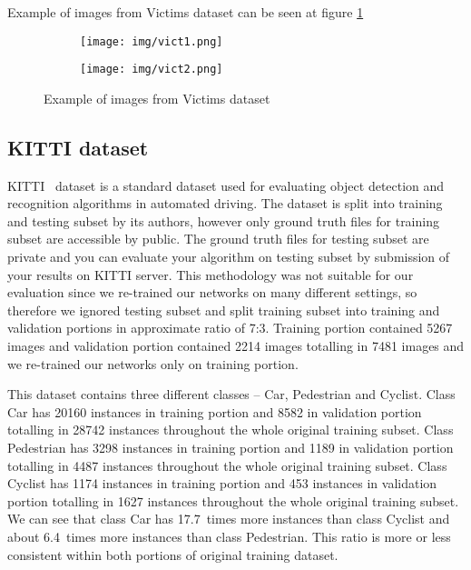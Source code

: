 Example of images from Victims dataset can be seen at figure \ref{victex}

\begin{figure}[!h]
\begin{subfigure}{.5\textwidth}
\centering
\texttt{[image: img/vict1.png]}
\end{subfigure}%
\begin{subfigure}{.5\textwidth}
\centering
\texttt{[image: img/vict2.png]}
\end{subfigure}
\caption{Example of images from Victims dataset}
\label{victex}
\end{figure}

\subsection{KITTI dataset}

KITTI~\cite{kitti} dataset is a standard dataset used for evaluating object detection and recognition algorithms in automated driving. The dataset is split into training and testing subset by its authors, however only ground truth files for training subset are accessible by public. The ground truth files for testing subset are private and you can evaluate your algorithm on testing subset by submission of your results on KITTI server. This methodology was not suitable for our evaluation since we re-trained our networks on many different settings, so therefore we ignored testing subset and split training subset into training and validation portions in approximate ratio of 7:3. Training portion contained 5267 images and validation portion contained 2214 images totalling in 7481 images and we re-trained our networks only on training portion.

This dataset contains three different classes -- Car, Pedestrian and Cyclist. Class Car has 20160 instances in training portion and 8582 in validation portion totalling in 28742 instances throughout the whole original training subset. Class Pedestrian has 3298 instances in training portion and 1189 in validation portion totalling in 4487 instances throughout the whole original training subset. Class Cyclist has 1174 instances in training portion and 453 instances in validation portion totalling in 1627 instances throughout the whole original training subset. We can see that class Car has 17.7~times more instances than class Cyclist and about 6.4~times more instances than class Pedestrian. This ratio is more or less consistent within both portions of original training dataset.

